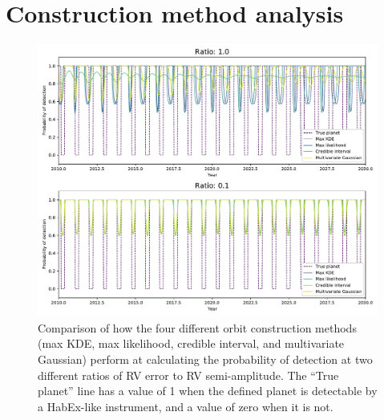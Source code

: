 \section{Construction method analysis}%
\label{sec:construction_method_analysis}
\begin{figure}[htpb]
    \centering
    \includegraphics[width=\linewidth]{ch1/figures/prob_det_new.pdf}
    \caption{Comparison of how the four different orbit construction methods (max KDE, max
    likelihood, credible interval, and multivariate Gaussian) perform at calculating the
    probability of detection at two different ratios of RV error to RV semi-amplitude. The ``True
    planet'' line has a value of 1 when the defined planet is detectable by a HabEx-like instrument, and a value of zero when it is not.}%
    \label{fig:prob_det_comparison}
\end{figure}
